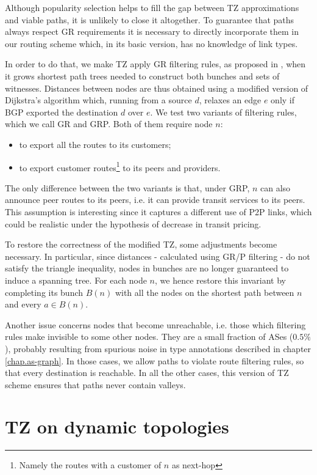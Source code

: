 \documentclass[a4paper,11pt,oneside]{report}
\begin{document}
\bigskip
Although popularity selection helps to fill the gap between TZ approximations and viable paths, it is unlikely to close it altogether. To guarantee that paths always respect GR requirements it is necessary to directly incorporate them in our routing scheme which, in its basic version, has no knowledge of link types. 

\bigskip
In order to do that, we make TZ apply GR filtering rules, as proposed in \cite{lixingaoStableInternetRouting2001}, when it grows shortest path trees needed to construct both bunches and sets of witnesses.
Distances between nodes are thus obtained using a modified version of Dijkstra's algorithm which, running from a source $d$, relaxes an edge $e$ only if BGP exported the destination $d$ over $e$. We test two variants of filtering rules, which we call GR and GRP. Both of them require node $n$:
\begin{itemize}
\item to export all the routes to its customers;
\item to export customer routes\footnote{Namely the routes with a customer of $n$ as next-hop} to its peers and providers.
\end{itemize}
The only difference between the two variants is that, under GRP, $n$ can also announce peer routes to its peers, i.e. it can provide transit services to its peers. This assumption is interesting since it captures a different use of P2P links, which could be realistic under the hypothesis of decrease in transit pricing.

\bigskip
To restore the correctness of the modified TZ, some adjustments become necessary. In particular, since distances - calculated using GR/P filtering - do not satisfy the triangle inequality, nodes in bunches are no longer guaranteed to induce a spanning tree. For each node $n$, we hence restore this invariant by completing its bunch $B(n)$ with all the nodes on the shortest path between $n$ and every $a \in B(n)$.

Another issue concerns nodes that become unreachable, i.e. those which filtering rules make invisible to some other nodes. They are a small fraction of ASes ($0.5\%$), probably resulting from spurious noise in type annotations described in chapter \ref{chap.as-graph}. In those cases, we allow paths to violate route filtering rules, so that every destination is reachable.
In all the other cases, this version of TZ scheme ensures that paths never contain valleys.

\chapter{TZ on dynamic topologies}
\label{chap.dyn_topology}
\end{document}
